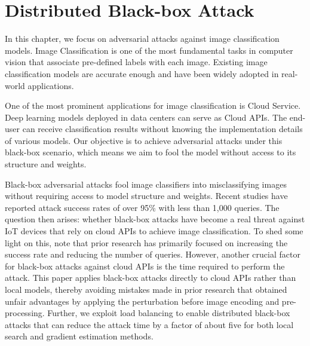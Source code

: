 \chapter{Distributed Black-box Attack}
\label{chpt:classification}


In this chapter, we focus on adversarial attacks against image classification models. Image Classification is one of the most fundamental tasks in computer vision that associate pre-defined labels with each image. Existing image classification models are accurate enough and have been widely adopted in real-world applications.

One of the most prominent applications for image classification is Cloud Service. Deep learning models deployed in data centers can serve as Cloud APIs. The end-user can receive classification results without knowing the implementation details of various models. Our objective is to achieve adversarial attacks under this black-box scenario, which means we aim to fool the model without access to its structure and weights.



Black-box adversarial attacks fool image classifiers into misclassifying images without requiring access to model structure and weights. Recent studies have reported attack success rates of over 95\% with less than 1,000 queries. The question then arises: whether black-box attacks have become a real threat against IoT devices that rely on cloud APIs to achieve image classification. To shed some light on this, note that prior research has primarily focused on increasing the success rate and reducing the number of queries. However, another crucial factor for black-box attacks against cloud APIs is the time required to perform the attack. This paper applies black-box attacks directly to cloud APIs rather than local models, thereby avoiding mistakes made in prior research that obtained unfair advantages by applying the perturbation before image encoding and pre-processing. Further, we exploit load balancing to enable distributed black-box attacks that can reduce the attack time by a factor of about five for both local search and gradient estimation methods. 

